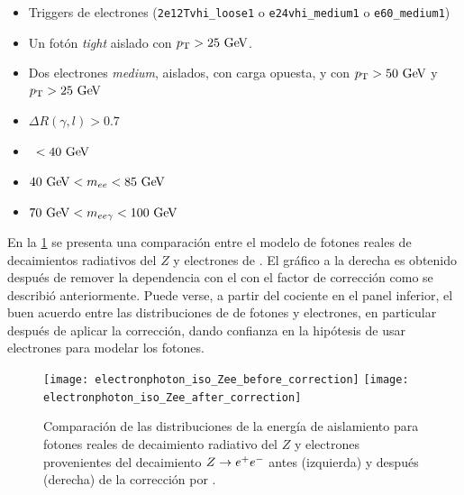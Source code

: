 \begin{itemize}\itemsep0.1cm
\item Triggers de electrones (\texttt{2e12Tvhi\_loose1} o \texttt{e24vhi\_medium1} o \texttt{e60\_medium1})
\item Un fotón \emph{tight} aislado con $\pt>25 \gev$.
\item Dos electrones \emph{medium}, aislados, con carga opuesta, y con $\pt>50 \gev$ y $\pt>25 \gev$
\item $\Delta R(\gamma,l)>0.7$
\item \MET\ $<40\gev$
\item $40\gev<m_{ee}<85\gev$
\item $70\gev<m_{ee\gamma}<100\gev$
\end{itemize}

En la \cref{fig:photon_electron_iso} se presenta una comparación entre el modelo
de fotones reales de decaimientos radiativos del $Z$ y electrones de {\Zee}. El
gráfico a la derecha es obtenido después de remover la dependencia con el {\pt}
con el factor de corrección como se describió anteriormente. Puede verse, a partir
del cociente en el panel inferior,
el buen acuerdo entre las distribuciones de {\etiso} de fotones y
electrones, en particular después de aplicar la corrección, dando confianza en la
hipótesis de usar electrones para modelar los fotones.


\begin{figure}[!htbp]
  \centering

  \texttt{[image: electronphoton\_iso\_Zee\_before\_correction]}
  \texttt{[image: electronphoton\_iso\_Zee\_after\_correction]}

  \caption{Comparación de las distribuciones de la energía de aislamiento para fotones reales de
    decaimiento radiativo del $Z$ y electrones provenientes del decaimiento $Z \rightarrow e^+ e^-$ antes (izquierda)
    y después (derecha) de la corrección por \pt.}
    \label{fig:photon_electron_iso}

\end{figure}



